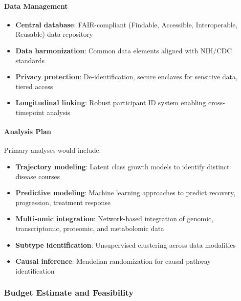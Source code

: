 \paragraph{Data Management}
\begin{itemize}
    \item \textbf{Central database}: FAIR-compliant (Findable, Accessible, Interoperable, Reusable) data repository
    \item \textbf{Data harmonization}: Common data elements aligned with NIH/CDC standards
    \item \textbf{Privacy protection}: De-identification, secure enclaves for sensitive data, tiered access
    \item \textbf{Longitudinal linking}: Robust participant ID system enabling cross-timepoint analysis
\end{itemize}

\paragraph{Analysis Plan}
Primary analyses would include:
\begin{itemize}
    \item \textbf{Trajectory modeling}: Latent class growth models to identify distinct disease courses
    \item \textbf{Predictive modeling}: Machine learning approaches to predict recovery, progression, treatment response
    \item \textbf{Multi-omic integration}: Network-based integration of genomic, transcriptomic, proteomic, and metabolomic data
    \item \textbf{Subtype identification}: Unsupervised clustering across data modalities
    \item \textbf{Causal inference}: Mendelian randomization for causal pathway identification
\end{itemize}

\subsubsection{Budget Estimate and Feasibility}

